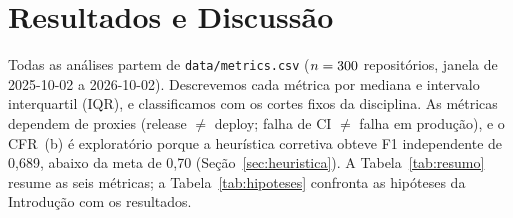 
\section{Resultados e Discussão}\label{sec:resultados}

Todas as análises partem de \texttt{data/metrics.csv} ($n = 300$ repositórios, janela de
2025-10-02 a 2026-10-02). Descrevemos cada métrica por mediana e intervalo interquartil (IQR), e classificamos
com os cortes fixos da disciplina. As métricas dependem de proxies (release $\neq$ deploy; falha de CI
$\neq$ falha em produção), e o CFR~(b) é exploratório porque a heurística corretiva obteve F1 independente de
0,689, abaixo da meta de 0,70 (Seção~\ref{sec:heuristica}). A Tabela~\ref{tab:resumo} resume as seis
métricas; a Tabela~\ref{tab:hipoteses} confronta as hipóteses da Introdução com os resultados.

\begin{table}[ht]
\centering\small
\caption{Resumo das métricas por repositório: mediana, quartis, IQR e classe DORA. ``Classe (mediana)'' classifica
o valor da mediana; E/H/M/L é o número de repositórios em Elite/High/Medium/Low. Recuperação: apenas
repositórios com episódio concluído.}
\label{tab:resumo}
\resizebox{\linewidth}{!}{}
\end{table}

